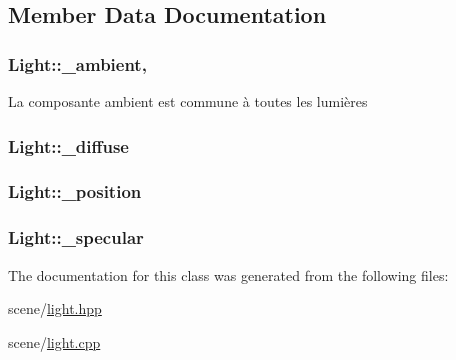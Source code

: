 \subsection{Member Data Documentation}
\hypertarget{class_light_ab139b739498b75944c99203027332ad9}{
\subsubsection[{\+\_\+ambient}]{ Light\+::\+\_\+ambient\hspace{0.3cm}{\ttfamily [static]}, {\ttfamily [private]}}}\label{class_light_ab139b739498b75944c99203027332ad9}
La composante ambient est commune à toutes les lumières \hypertarget{class_light_a32445f2054766ef532c29eb514b2599d}{
\subsubsection[{\+\_\+diffuse}]{ Light\+::\+\_\+diffuse\hspace{0.3cm}{\ttfamily [private]}}}\label{class_light_a32445f2054766ef532c29eb514b2599d}
\hypertarget{class_light_a3af8c823a869606782bd9e1872586b72}{
\subsubsection[{\+\_\+position}]{ Light\+::\+\_\+position\hspace{0.3cm}{\ttfamily [private]}}}\label{class_light_a3af8c823a869606782bd9e1872586b72}
\hypertarget{class_light_a36414dc1e8a75b36652bc5a12b2ea43d}{
\subsubsection[{\+\_\+specular}]{ Light\+::\+\_\+specular\hspace{0.3cm}{\ttfamily [private]}}}\label{class_light_a36414dc1e8a75b36652bc5a12b2ea43d}


The documentation for this class was generated from the following files\+:\begin{DoxyCompactItemize}
\item 
scene/\hyperlink{light_8hpp}{light.\+hpp}\item 
scene/\hyperlink{light_8cpp}{light.\+cpp}\end{DoxyCompactItemize}
